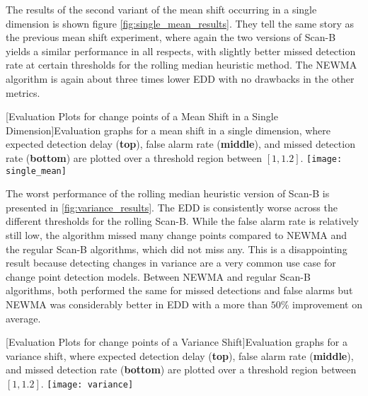 The results of the second variant of the mean shift occurring in a single dimension is shown figure \ref{fig:single_mean_results}. They tell the same story as the previous mean shift experiment, where again the two versions of Scan-B yields a similar performance in all respects, with slightly better missed detection rate at certain thresholds for the rolling median heuristic method. The NEWMA algorithm is again about three times lower EDD with no drawbacks in the other metrics.

\begin{minipage}{\textwidth}
\begin{center} 
[Evaluation Plots for change points of a Mean Shift in a Single Dimension]{Evaluation graphs for a mean shift in a single dimension, where expected detection delay (\textbf{top}), false alarm rate (\textbf{middle}), and missed detection rate (\textbf{bottom}) are plotted over a threshold region between $[1,1.2]$. } 
\texttt{[image: single\_mean]} 
\label{fig:single_mean_results} 
\end{center}
\end{minipage}

The worst performance of the rolling median heuristic version of Scan-B is presented in \ref{fig:variance_results}. The EDD is consistently worse across the different thresholds for the rolling Scan-B. While the false alarm rate is relatively still low, the algorithm missed many change points compared to NEWMA and the regular Scan-B algorithms, which did not miss any. This is a disappointing result because detecting changes in variance are a very common use case for change point detection models. Between NEWMA and regular Scan-B algorithms, both performed the same for missed detections and false alarms but NEWMA was considerably better in EDD with a more than $50\%$ improvement on average.

\begin{minipage}{\textwidth}
\begin{center} 
[Evaluation Plots for change points of a Variance Shift]{Evaluation graphs for a variance shift, where expected detection delay (\textbf{top}), false alarm rate (\textbf{middle}), and missed detection rate (\textbf{bottom}) are plotted over a threshold region between $[1,1.2]$. } 
\texttt{[image: variance]} 
\label{fig:variance_results} 
\end{center}
\end{minipage}

